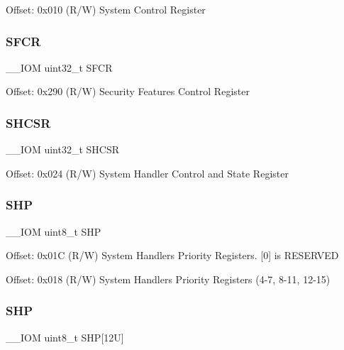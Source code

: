 Offset\+: 0x010 (R/W) System Control Register \mbox{\label{struct_s_c_b___type_aaddfff3b57de6faf60bfcc938c7229c9}} 
\subsubsection{\texorpdfstring{S\+F\+CR}{SFCR}}
{\footnotesize\ttfamily \+\_\+\+\_\+\+I\+OM uint32\+\_\+t S\+F\+CR}

Offset\+: 0x290 (R/W) Security Features Control Register \mbox{\label{struct_s_c_b___type_a44ad5c292dbd77e72f310902375a8a06}} 
\subsubsection{\texorpdfstring{S\+H\+C\+SR}{SHCSR}}
{\footnotesize\ttfamily \+\_\+\+\_\+\+I\+OM uint32\+\_\+t S\+H\+C\+SR}

Offset\+: 0x024 (R/W) System Handler Control and State Register \mbox{\label{struct_s_c_b___type_aa043193516e3fc0abbf58ce7cf8cfb4e}} 
\subsubsection{\texorpdfstring{S\+HP}{SHP}\hspace{0.1cm}{\footnotesize\ttfamily [1/2]}}
{\footnotesize\ttfamily \+\_\+\+\_\+\+I\+OM uint8\+\_\+t S\+HP}

Offset\+: 0x01C (R/W) System Handlers Priority Registers. \mbox{[}0\mbox{]} is R\+E\+S\+E\+R\+V\+ED

Offset\+: 0x018 (R/W) System Handlers Priority Registers (4-\/7, 8-\/11, 12-\/15) \mbox{\label{struct_s_c_b___type_a293826a2c44f754e80af03d62f62f9e6}} 
\subsubsection{\texorpdfstring{S\+HP}{SHP}\hspace{0.1cm}{\footnotesize\ttfamily [2/2]}}
{\footnotesize\ttfamily \+\_\+\+\_\+\+I\+OM uint8\+\_\+t S\+HP\mbox{[}12\+U\mbox{]}}

